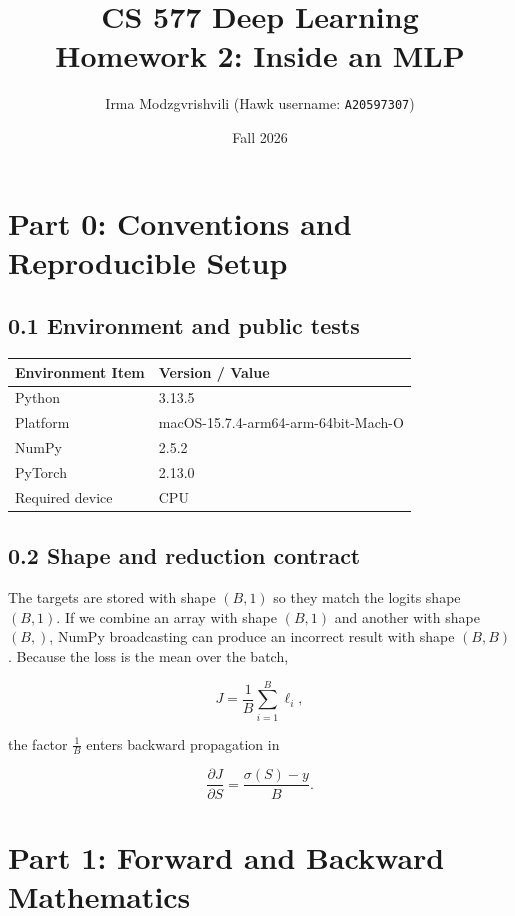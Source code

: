 \documentclass[11pt]{article}
\title{CS 577 Deep Learning\\Homework 2: Inside an MLP}
\author{Irma Modzgvrishvili (Hawk username: \texttt{A20597307})}
\date{Fall 2026}
\begin{document}
\maketitle

\section*{Part 0: Conventions and Reproducible Setup}

\subsection*{0.1 Environment and public tests}
\begin{center}
  \begin{tabular}{ll}
    \toprule
    Environment Item & Version / Value \\
      \midrule
      Python & 3.13.5 \\
      Platform & macOS-15.7.4-arm64-arm-64bit-Mach-O \\
      NumPy & 2.5.2 \\
      PyTorch & 2.13.0 \\
      Required device & CPU \\
      \bottomrule
  \end{tabular}
\end{center}
\subsection*{0.2 Shape and reduction contract}
The targets are stored with shape $(B,1)$ so they match the logits shape $(B,1)$.
If we combine an array with shape $(B,1)$ and another with shape $(B,)$, NumPy broadcasting can produce an incorrect result with shape $(B,B)$.
Because the loss is the mean over the batch,

        \[
          J = \frac{1}{B}\sum_{i=1}^{B}\ell_i,
        \]

the factor $\frac{1}{B}$ enters backward propagation in

        \[
          \frac{\partial J}{\partial S}
          =
          \frac{\sigma(S)-y}{B}.
        \]
\section*{Part 1: Forward and Backward Mathematics}
\end{document}
